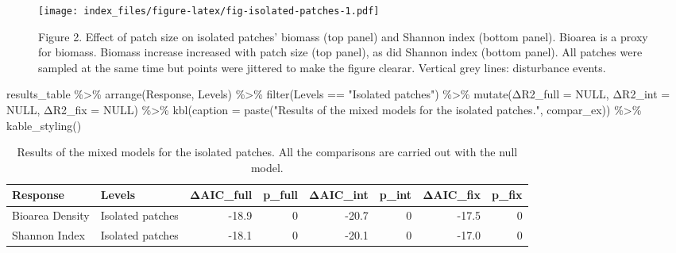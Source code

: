 \documentclass[
]{article}
\newenvironment{Shaded}{\begin{snugshade}}{\end{snugshade}}
\newcommand{\AttributeTok}[1]{\textcolor[rgb]{0.77,0.63,0.00}{#1}}
\newcommand{\ConstantTok}[1]{\textcolor[rgb]{0.00,0.00,0.00}{#1}}
\newcommand{\FunctionTok}[1]{\textcolor[rgb]{0.00,0.00,0.00}{#1}}
\newcommand{\NormalTok}[1]{#1}
\newcommand{\SpecialCharTok}[1]{\textcolor[rgb]{0.00,0.00,0.00}{#1}}
\newcommand{\StringTok}[1]{\textcolor[rgb]{0.31,0.60,0.02}{#1}}
\begin{document}
\begin{figure}
\centering
\texttt{[image: index\_files/figure-latex/fig-isolated-patches-1.pdf]}
\caption{Figure 2. Effect of patch size on isolated patches' biomass
(top panel) and Shannon index (bottom panel). Bioarea is a proxy for
biomass. Biomass increase increased with patch size (top panel), as did
Shannon index (bottom panel). All patches were sampled at the same time
but points were jittered to make the figure clearar. Vertical grey
lines: disturbance events.}
\end{figure}

\begin{Shaded}
\begin{Highlighting}[]
\NormalTok{results\_table }\SpecialCharTok{\%\textgreater{}\%}
  \FunctionTok{arrange}\NormalTok{(Response, Levels) }\SpecialCharTok{\%\textgreater{}\%}
  \FunctionTok{filter}\NormalTok{(Levels }\SpecialCharTok{==} \StringTok{"Isolated patches"}\NormalTok{) }\SpecialCharTok{\%\textgreater{}\%}
  \FunctionTok{mutate}\NormalTok{(Δ}\AttributeTok{R2\_full =} \ConstantTok{NULL}\NormalTok{,}
\NormalTok{         Δ}\AttributeTok{R2\_int =} \ConstantTok{NULL}\NormalTok{,}
\NormalTok{         Δ}\AttributeTok{R2\_fix =} \ConstantTok{NULL}\NormalTok{) }\SpecialCharTok{\%\textgreater{}\%}
  \FunctionTok{kbl}\NormalTok{(}\AttributeTok{caption =} \FunctionTok{paste}\NormalTok{(}\StringTok{"Results of the mixed models for the isolated patches."}\NormalTok{, compar\_ex)) }\SpecialCharTok{\%\textgreater{}\%}
  \FunctionTok{kable\_styling}\NormalTok{()}
\end{Highlighting}
\end{Shaded}

\begin{table}

\caption{\label{tab:fig-isolated-patches}Results of the mixed models for the isolated patches. All the comparisons are carried out with the null model.}
\centering
\begin{tabular}[t]{l|l|r|r|r|r|r|r}
\hline
Response & Levels & ΔAIC\_full & p\_full & ΔAIC\_int & p\_int & ΔAIC\_fix & p\_fix\\
\hline
Bioarea Density & Isolated patches & -18.9 & 0 & -20.7 & 0 & -17.5 & 0\\
\hline
Shannon Index & Isolated patches & -18.1 & 0 & -20.1 & 0 & -17.0 & 0\\
\hline
\end{tabular}
\end{table}
\end{document}
